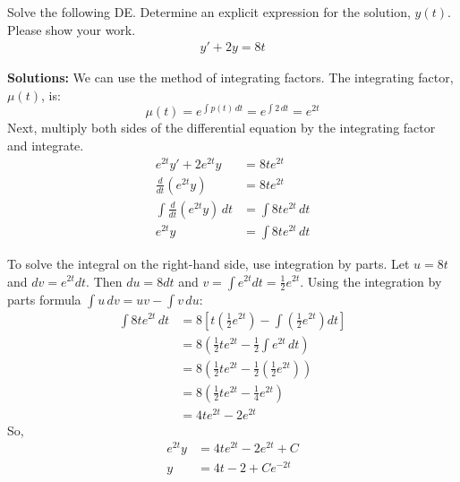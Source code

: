 \ifnum {}
\question[5] Solve the following DE. Determine an explicit expression for the solution, $y(t)$. Please show your work. 
\begin{align*}
    y'+2y=8t
\end{align*}
\ifnum {} {\color{DarkBlue} 
\textbf{Solutions:} We can use the method of integrating factors. The integrating factor, \( \mu(t) \), is:
\[
\mu(t) = e^{\int p(t) \, dt} = e^{\int 2 \, dt} = e^{2t}
\]
Next, multiply both sides of the differential equation by the integrating factor and integrate. 
\begin{align}
e^{2t} y' + 2 e^{2t} y &= 8t e^{2t}\\
\frac{d}{dt} \left( e^{2t} y \right) &= 8t e^{2t}\\
\int \frac{d}{dt} \left( e^{2t} y \right) \, dt &= \int 8t e^{2t} \, dt\\
e^{2t} y &= \int 8t e^{2t} \, dt    
\end{align}

To solve the integral on the right-hand side, use integration by parts. Let \( u = 8t \) and \( dv = e^{2t} dt \). Then \( du = 8 dt \) and \( v = \int e^{2t} dt = \frac{1}{2} e^{2t} \). Using the integration by parts formula \(\int u \, dv = uv - \int v \, du\):
\begin{align}
    \int 8t e^{2t} \, dt 
    &= 8 \left[ t \left( \frac{1}{2} e^{2t} \right) - \int \left( \frac{1}{2} e^{2t} \right) dt \right]\\
    &= 8 \left( \frac{1}{2} t e^{2t} - \frac{1}{2} \int e^{2t} \, dt \right)\\
    &= 8 \left( \frac{1}{2} t e^{2t} - \frac{1}{2} \left( \frac{1}{2} e^{2t} \right) \right) \\
    &= 8 \left( \frac{1}{2} t e^{2t} - \frac{1}{4} e^{2t} \right)\\ 
    &= 4 t e^{2t} - 2 e^{2t}
\end{align}
So,
\begin{align}
    e^{2t} y &= 4 t e^{2t} - 2 e^{2t} + C    \\ 
    y &= 4 t - 2 + C e^{-2t} 
\end{align}

} 
\else 
\fi
\fi

